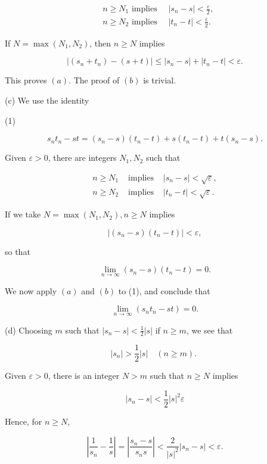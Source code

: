 \documentclass[10pt]{article}
\begin{document}
$$
\begin{aligned}
& n \geq N_{1} \text { implies } \quad\left|s_{n}-s\right|<\frac{\varepsilon}{2}, \\
& n \geq N_{2} \text { implies } \quad\left|t_{n}-t\right|<\frac{\varepsilon}{2} .
\end{aligned}
$$

If $N=\max \left(N_{1}, N_{2}\right)$, then $n \geq N$ implies

$$
\left|\left(s_{n}+t_{n}\right)-(s+t)\right| \leq\left|s_{n}-s\right|+\left|t_{n}-t\right|<\varepsilon .
$$

This proves $(a)$. The proof of $(b)$ is trivial.

(c) We use the identity

(1)

$$
s_{n} t_{n}-s t=\left(s_{n}-s\right)\left(t_{n}-t\right)+s\left(t_{n}-t\right)+t\left(s_{n}-s\right) .
$$

Given $\varepsilon>0$, there are integers $N_{1}, N_{2}$ such that

$$
\begin{array}{lll}
n \geq N_{1} & \text { implies } & \left|s_{n}-s\right|<\sqrt{\varepsilon}, \\
n \geq N_{2} & \text { implies } & \left|t_{n}-t\right|<\sqrt{\varepsilon} .
\end{array}
$$

If we take $N=\max \left(N_{1}, N_{2}\right), n \geq N$ implies

$$
\left|\left(s_{n}-s\right)\left(t_{n}-t\right)\right|<\varepsilon,
$$

so that

$$
\lim _{n \rightarrow \infty}\left(s_{n}-s\right)\left(t_{n}-t\right)=0 .
$$

We now apply $(a)$ and $(b)$ to (1), and conclude that

$$
\lim _{n \rightarrow \infty}\left(s_{n} t_{n}-s t\right)=0 .
$$

(d) Choosing $m$ such that $\left|s_{n}-s\right|<\frac{1}{2}|s|$ if $n \geq m$, we see that

$$
\left|s_{n}\right|>\frac{1}{2}|s| \quad(n \geq m) \text {. }
$$

Given $\varepsilon>0$, there is an integer $N>m$ such that $n \geq N$ implies

$$
\left|s_{n}-s\right|<\frac{1}{2}|s|^{2} \varepsilon
$$

Hence, for $n \geq N$,

$$
\left|\frac{1}{s_{n}}-\frac{1}{s}\right|=\left|\frac{s_{n}-s}{s_{n} s}\right|<\frac{2}{|s|^{2}}\left|s_{n}-s\right|<\varepsilon .
$$
\end{document}
